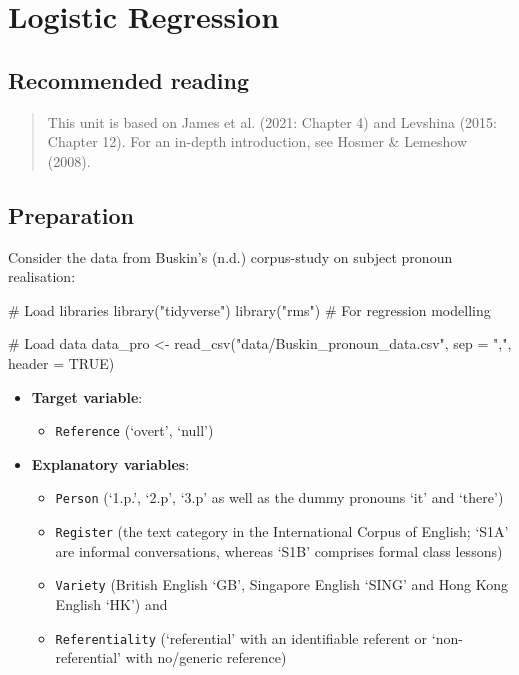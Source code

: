 \documentclass[
  11pt,
  letterpaper,
  DIV=11,
  numbers=noendperiod]{scrreprt}
\newenvironment{Shaded}{\begin{snugshade}}{\end{snugshade}}
\newcommand{\AttributeTok}[1]{\textcolor[rgb]{0.40,0.45,0.13}{#1}}
\newcommand{\CommentTok}[1]{\textcolor[rgb]{0.37,0.37,0.37}{#1}}
\newcommand{\ConstantTok}[1]{\textcolor[rgb]{0.56,0.35,0.01}{#1}}
\newcommand{\FunctionTok}[1]{\textcolor[rgb]{0.28,0.35,0.67}{#1}}
\newcommand{\NormalTok}[1]{\textcolor[rgb]{0.00,0.23,0.31}{#1}}
\newcommand{\OtherTok}[1]{\textcolor[rgb]{0.00,0.23,0.31}{#1}}
\newcommand{\StringTok}[1]{\textcolor[rgb]{0.13,0.47,0.30}{#1}}
\providecommand{\tightlist}{%
  \setlength{\itemsep}{0pt}\setlength{\parskip}{0pt}}\usepackage{longtable,booktabs,array}
\begin{document}
\chapter{Logistic Regression}\label{logistic-regression}

\section{Recommended reading}\label{recommended-reading-5}

\begin{quote}
This unit is based on James et al. (2021: Chapter 4) and Levshina (2015:
Chapter 12). For an in-depth introduction, see Hosmer \& Lemeshow
(2008).
\end{quote}

\section{Preparation}\label{preparation-8}

Consider the data from Buskin's (n.d.) corpus-study on subject pronoun
realisation:

\begin{Shaded}
\begin{Highlighting}[]
\CommentTok{\# Load libraries}
\FunctionTok{library}\NormalTok{(}\StringTok{"tidyverse"}\NormalTok{)}
\FunctionTok{library}\NormalTok{(}\StringTok{"rms"}\NormalTok{) }\CommentTok{\# For regression modelling}

\CommentTok{\# Load data}
\NormalTok{data\_pro }\OtherTok{\textless{}{-}} \FunctionTok{read\_csv}\NormalTok{(}\StringTok{"data/Buskin\_pronoun\_data.csv"}\NormalTok{, }\AttributeTok{sep =} \StringTok{","}\NormalTok{, }\AttributeTok{header =} \ConstantTok{TRUE}\NormalTok{)}
\end{Highlighting}
\end{Shaded}

\begin{itemize}
\item
  \textbf{Target variable}:

  \begin{itemize}
  \tightlist
  \item
    \texttt{Reference} (`overt', `null')
  \end{itemize}
\item
  \textbf{Explanatory variables}:

  \begin{itemize}
  \item
    \texttt{Person} (`1.p.', `2.p', `3.p' as well as the dummy pronouns
    `it' and `there')
  \item
    \texttt{Register} (the text category in the International Corpus of
    English; `S1A' are informal conversations, whereas `S1B' comprises
    formal class lessons)
  \item
    \texttt{Variety} (British English `GB', Singapore English `SING' and
    Hong Kong English `HK') and
  \item
    \texttt{Referentiality} (`referential' with an identifiable referent
    or `non-referential' with no/generic reference)
  \end{itemize}
\end{itemize}
\end{document}
